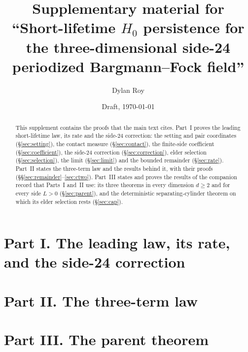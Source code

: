 \documentclass[11pt,reqno]{amsart}
\numberwithin{equation}{section}
\theoremstyle{definition}
\theoremstyle{remark}
\begin{document}
\title[Supplement: short-lifetime $H_0$ persistence on the side-24 torus]{Supplementary material for ``Short-lifetime $H_0$ persistence for the three-dimensional side-24 periodized Bargmann--Fock field''}
\author{Dylan Roy}
\date{Draft, \today}

\begin{abstract}
This supplement contains the proofs that the main text cites. Part~I proves the leading short-lifetime law, its rate and the side-24 correction: the setting and pair coordinates (\S\ref{sec:setting}), the contact measure (\S\ref{sec:contact}), the finite-side coefficient (\S\ref{sec:coefficient}), the side-24 correction (\S\ref{sec:correction}), elder selection (\S\ref{sec:selection}), the limit (\S\ref{sec:limit}) and the bounded remainder (\S\ref{sec:rate}). Part~II states the three-term law and the results behind it, with their proofs (\S\S\ref{sec:remainder}--\ref{sec:ctwo}). Part~III states and proves the results of the companion record that Parts~I and~II use: its three theorems in every dimension $d\ge2$ and for every side $L>0$ (\S\ref{sec:parent}), and the deterministic separating-cylinder theorem on which its elder selection rests (\S\ref{sec:cap}).
\end{abstract}

\maketitle


\part*{Part I. The leading law, its rate, and the side-24 correction}







\part*{Part II. The three-term law}




\part*{Part III. The parent theorem}





\end{document}
